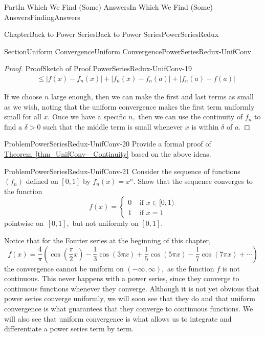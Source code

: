 \documentclass[oneside,10pt,]{book}
\newcommand{\xreffont}{\relax}
\numberwithin{equation}{part}
\newcommand{\amp}{&}
\begin{document}
\begin{partptx}{Part}{In Which We Find (Some) Answers}{}{In Which We Find (Some) Answers}{}{}{FindingAnswers}
\begin{chapterptx}{Chapter}{Back to Power Series}{}{Back to Power Series}{}{}{PowerSeriesRedux}
\begin{sectionptx}{Section}{Uniform Convergence}{}{Uniform Convergence}{}{}{PowerSeriesRedux-UnifConv}
\begin{proof}{Proof}{Sketch of Proof.}{PowerSeriesRedux-UnifConv-19}
\begin{align*}
\amp \leq \left|f(x)-f_n(x)\right|+\left|f_n(x)-f_n(a)\right|+\left|f_n(a)-f(a)\right|
\end{align*}
%
\par
If we choose \(n\) large enough, then we can make the first and last terms as small as we wish, noting that the uniform convergence makes the first term uniformly small for all \(x\).  Once we have a specific \(n,\) then we can use the continuity of \(f_n\) to find a \(\delta>0\) such that the middle term is small whenever \(x\) is within \(\delta\) of \(a\).%
\end{proof}
\begin{problem}{Problem}{}{PowerSeriesRedux-UnifConv-20}%
Provide a formal proof of \hyperref[thm_UnifConv-_Continuity]{Theorem~{\xreffont\ref{thm_UnifConv-_Continuity}}} based on the above ideas.%
\end{problem}
\begin{problem}{Problem}{}{PowerSeriesRedux-UnifConv-21}%
Consider the sequence of functions \(\left(f_n\right)\) defined on \([0,1]\) by \(f_n(x)=x^n\).  Show that the sequence converges to the function%
\begin{equation*}
f(x)= \begin{cases}0\amp \text{ if  } x\in[0,1)\\ 1\amp \text{ if } x=1 \end{cases}
\end{equation*}
pointwise on \(\,[0,1],\) but not uniformly on \([0,1]\).%
\end{problem}
Notice that for the Fourier series at the beginning of this chapter,%
\begin{equation*}
f(x)=\frac{4}{\pi}\left(\cos\left(\frac{\pi}{2}x\right)-\frac{1}{3}\cos\left( 3\pi x\right)+\frac{1}{5}\cos\left(5\pi x\right)-\frac{1}{7}\cos\left(7\pi x\right)+\cdots\right)
\end{equation*}
the convergence cannot be uniform on \((-\infty,\infty),\) as the function \(f\) is not continuous.  This never happens with a power series, since they converge to continuous functions whenever they converge. Although it is not yet obvious that power series converge uniformly, we will soon see that they do and that uniform convergence is what guarantees that they converge to continuous functions. We will also see that uniform convergence is what allows us to integrate and differentiate a power series term by term.%
\end{sectionptx}
%
%
\typeout{************************************************}

\end{chapterptx}
\end{partptx}
\end{document}
